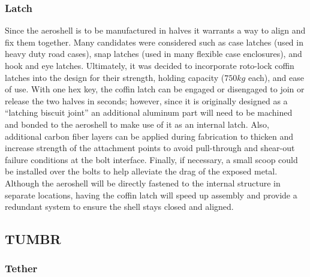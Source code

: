 
\subsubsection{Latch}

\indent\indent Since the aeroshell is to be manufactured in halves it warrants a way to align and fix them together. Many candidates were considered such as case latches (used in heavy duty road cases), snap latches (used in many flexible case enclosures), and hook and eye latches. Ultimately, it was decided to incorporate roto-lock coffin latches into the design for their strength, holding capacity ($750 kg$ each), and ease of use. With one hex key, the coffin latch can be engaged or disengaged to join or release the two halves in seconds; however, since it is originally designed as a “latching biscuit joint” an additional aluminum part will need to be machined and bonded to the aeroshell to make use of it as an internal latch. Also, additional carbon fiber layers can be applied during fabrication to thicken and increase strength of the attachment points to avoid pull-through and shear-out failure conditions at the bolt interface. Finally, if necessary, a small scoop could be installed over the bolts to help alleviate the drag of the exposed metal. Although the aeroshell will be directly fastened to the internal structure in separate locations, having the coffin latch will speed up assembly and provide a redundant system to ensure the shell stays closed and aligned.


\subsection{TUMBR}

\subsubsection{Tether}

